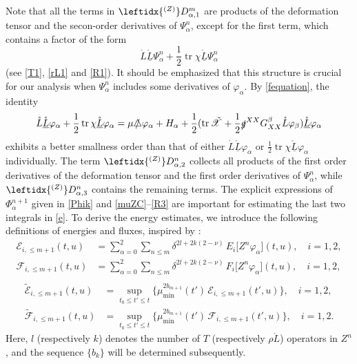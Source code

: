 \documentclass[11pt,twoside]{article}
\def\al{\alpha}
\def\vp{\varphi}
\def\f{\frac}
\begin{document}
Note that all the terms in $\leftidx{^{(Z)}}D_{\al,1}^m$ are products of the deformation tensor and the secon{-}order derivatives of $\Psi_\al^n$, except for the first term, which contains a factor of the form
\[
\mathring{L}\mathring{\underline{L}}\Psi_\al^n + \frac{1}{2}\operatorname{tr}{\chi}\mathring{\underline{L}}\Psi_\al^n
\]
(see \eqref{T1}, \eqref{rL1} and \eqref{R1}). It should be emphasized that this structure is crucial for our analysis
when $\Psi_\al^n$ includes
some derivatives of $\varphi_\al$. By \eqref{fequation}, the identity
\[
\mathring{L}\mathring{\underline{L}}\varphi_\al + \frac{1}{2}\operatorname{tr}{\chi}\mathring{\underline{L}}\varphi_\al
=\mu\slashed\triangle\vp_\al+ H_\al + \frac{1}{2}(\operatorname{tr}\check{\mathscr X}+\f12\slashed g^{XX}G_{XX}^\beta\mathring L\vp_\beta)\mathring{\underline{L}}\varphi_\al
\]
exhibits a better smallness order than that of either $\mathring{L}\mathring{\underline{L}}\varphi_\al$ or $\frac{1}{2}\operatorname{tr}{\chi}\mathring{\underline{L}}\varphi_\al$ individually.
The term $\leftidx{^{(Z)}}D_{\al,2}^n$ collects all products of the first order derivatives of the deformation tensor and the first
order derivatives of $\Psi_\al^n$, while $\leftidx{^{(Z)}}D_{\al,3}^n$ contains the remaining terms.
The explicit expressions of $\Phi_\al^{n+1}$ given in \eqref{Phik} and \eqref{muZC}--\eqref{R3} are important
for estimating the last two integrals in \eqref{e}. To derive the energy estimates, we introduce the
following definitions of energies and fluxes, inspired by \cite{Ch1,M-Y,Sp}:
\begin{equation*}\label{higher order energy and flux}
\begin{split}
\mathcal{E}_{i,\leq m+1}(t,u) &=
\sum_{\al=0}^2 \sum_{n \leq m}
\delta^{2l+2k(2-\nu)} \, E_i\bigl[Z^n \vp_\al\bigr](t,u),
\quad i=1,2, \\[8pt]
\mathcal{F}_{i,\leq m+1}(t,u) &=
\sum_{\al=0}^2 \sum_{n \leq m}
\delta^{2l+2k(2-\nu)} \, F_i\bigl[Z^n \vp_\al\bigr](t,u),
\quad i=1,2, \\[8pt]
\end{split}
\end{equation*}
\begin{equation}\label{higher order energy and flux}
\begin{split}
\widetilde{\mathcal{E}}_{i,\leq m+1}(t,u) &=
\sup_{t_0 \leq t' \leq t}
\big\{ \mu_{\min}^{2b_{m+1}}(t') \, \mathcal{E}_{i,\leq m+1}(t',u) \big\},
\quad i=1,2, \\[8pt]
\widetilde{\mathcal{F}}_{i,\leq m+1}(t,u) &=
\sup_{t_0 \leq t' \leq t}
\big\{ \mu_{\min}^{2b_{m+1}}(t') \, \mathcal{F}_{i,\leq m+1}(t',u) \big\},
\quad i=1,2.
\end{split}
\end{equation}
Here, $l$ (respectively $k$) denotes the number of $T$ (respectively $\rho \mathring{L}$) operators in $Z^n$,
and the sequence $\{b_k\}$ will be determined subsequently.
\end{document}
